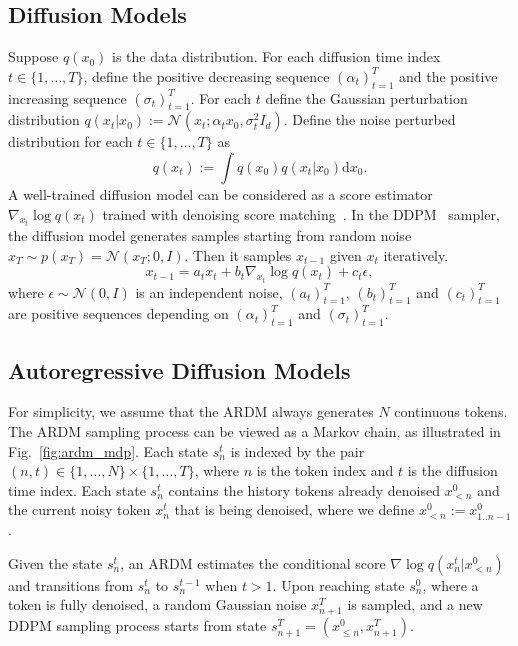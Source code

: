 \documentclass{article}
\begin{document}
\subsection{Diffusion Models}

Suppose $q(x_0)$ is the data distribution. For each diffusion time index $t \in \{1, \ldots, T\}$, define the positive decreasing sequence $(\alpha_t)_{t = 1}^T$ and the positive increasing sequence $(\sigma_t)_{t = 1}^T$. For each $t$ define the Gaussian perturbation distribution $q(x_t | x_0) := \mathcal N(x_t; \alpha_t x_0, \sigma_t^2 I_d)$. Define the noise perturbed distribution for each $t \in \{1, \ldots, T\}$ as
\begin{equation}
q(x_t) := \int q(x_0) q(x_t | x_0) \mathrm d x_0 .
\end{equation}
A well-trained diffusion model can be considered as a score estimator $\nabla_{x_t} \log q(x_t)$ trained with denoising score matching~\cite{ScoreSDE}. In the DDPM~\cite{DDPM,DDIM} sampler, the diffusion model generates samples starting from random noise $x_T \sim p(x_T) = \mathcal N(x_T; 0, I)$. Then it samples $x_{t - 1}$ given $x_t$ iteratively.
\begin{equation}
x_{t - 1} =  a_t x_t + b_t \nabla_{x_t} \log q(x_t) + c_t \epsilon,
\end{equation}
where $\epsilon \sim \mathcal N(0, I)$ is an independent noise, $(a_t)_{t = 1}^T$, $(b_t)_{t = 1}^T$ and $(c_t)_{t = 1}^T$ are positive sequences depending on $(\alpha_t)_{t = 1}^T$ and $(\sigma_t)_{t = 1}^T$.

\subsection{Autoregressive Diffusion Models}

For simplicity, we assume that the ARDM always generates $N$ continuous tokens. The ARDM sampling process can be viewed as a Markov chain, as illustrated in Fig.~\ref{fig:ardm_mdp}. Each state $s_{n}^t$ is indexed by the pair $(n, t) \in \{1, \ldots, N\} \times \{1, \ldots, T\}$, where $n$ is the token index and $t$ is the diffusion time index. Each state $s_{n}^t$ contains the history tokens already denoised $x^0_{<n}$ and the current noisy token $x_{n}^t$ that is being denoised, where we define $x_{<n}^0 := x_{1..n-1}^0$.

Given the state $s_n^t$, an ARDM estimates the conditional score $\nabla \log q(x_n^{t} | x^0_{<n})$ and transitions from $s_n^t$ to $s_{n}^{t - 1}$ when $t > 1$. Upon reaching state $s_{n}^0$, where a token is fully denoised, a random Gaussian noise $x_{n+1}^T$ is sampled, and a new DDPM sampling process starts from state $s_{n + 1}^T = (x_{\le n}^0, x_{n + 1}^T)$.
\end{document}
